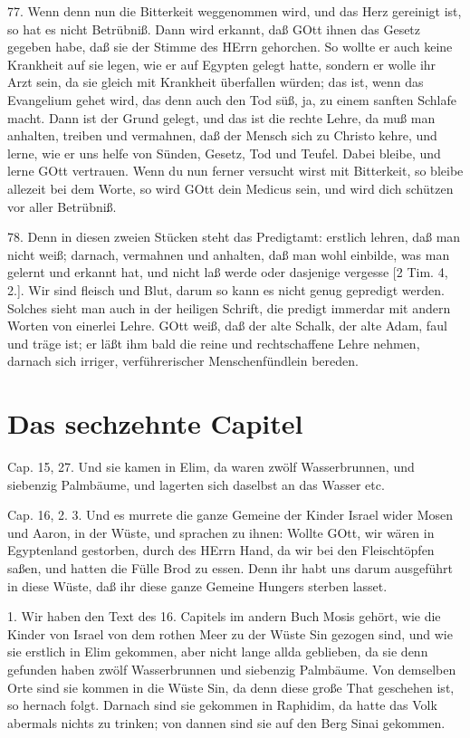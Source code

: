 77. Wenn denn nun die Bitterkeit weggenommen wird, und das Herz gereinigt ist, so hat es nicht Betrübniß. Dann wird erkannt, daß GOtt ihnen das Gesetz gegeben habe, daß sie der Stimme des HErrn gehorchen. So wollte er auch keine Krankheit auf sie legen, wie er auf Egypten gelegt hatte, sondern er wolle ihr Arzt sein, da sie gleich mit Krankheit überfallen würden; das ist, wenn das Evangelium gehet wird, das denn auch den Tod süß, ja, zu einem sanften Schlafe macht. Dann ist der Grund gelegt, und das ist die rechte Lehre, da muß man anhalten, treiben und vermahnen, daß der Mensch sich zu Christo kehre, und lerne, wie er uns helfe von Sünden, Gesetz, Tod und Teufel. Dabei bleibe, und lerne GOtt vertrauen. Wenn du nun ferner versucht wirst mit Bitterkeit, so bleibe allezeit bei dem Worte, so wird GOtt dein Medicus sein, und wird dich schützen vor aller Betrübniß.

78. Denn in diesen zweien Stücken steht das Predigtamt: erstlich lehren, daß man nicht weiß;
darnach, vermahnen und anhalten, daß man wohl einbilde, was man gelernt und erkannt hat, und nicht laß werde oder dasjenige vergesse [2 Tim. 4, 2.]. Wir sind fleisch und Blut, darum so kann es nicht genug gepredigt werden. Solches sieht man auch in der heiligen Schrift, die predigt immerdar mit andern Worten von einerlei Lehre. GOtt weiß, daß der alte Schalk, der alte Adam, faul und träge ist; er läßt ihm bald die reine und rechtschaffene Lehre nehmen, darnach sich irriger, verführerischer Menschenfündlein bereden.

\section{Das sechzehnte Capitel}

Cap. 15, 27. Und sie kamen in Elim, da waren zwölf Wasserbrunnen, und siebenzig Palmbäume, und lagerten sich daselbst an das Wasser etc.

Cap. 16, 2. 3. Und es murrete die ganze Gemeine der Kinder Israel wider Mosen und Aaron, in der Wüste, und sprachen zu ihnen: Wollte GOtt, wir wären in Egyptenland gestorben, durch des HErrn Hand, da wir bei den Fleischtöpfen saßen, und hatten die Fülle Brod zu essen. Denn ihr habt uns darum ausgeführt in diese Wüste, daß ihr diese ganze Gemeine Hungers sterben lasset.

1. Wir haben den Text des 16. Capitels im andern Buch Mosis gehört, wie die Kinder von Israel von dem rothen Meer zu der Wüste Sin gezogen sind, und wie sie erstlich in Elim gekommen, aber nicht lange allda geblieben, da sie denn gefunden haben zwölf Wasserbrunnen und siebenzig Palmbäume. Von demselben Orte sind sie kommen in die Wüste Sin, da denn diese große That geschehen ist, so hernach folgt. Darnach sind sie gekommen in Raphidim, da hatte das Volk abermals nichts zu trinken; von dannen sind sie auf den Berg Sinai gekommen.


